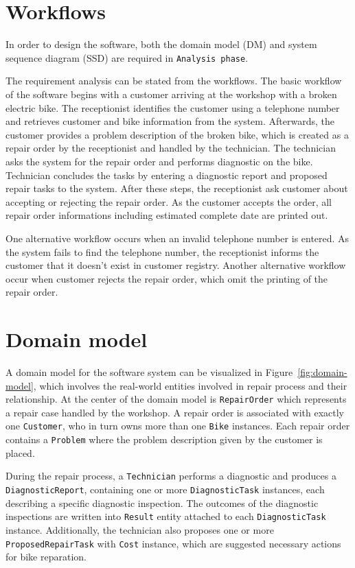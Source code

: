 \documentclass[a4paper]{scrartcl}
\begin{document}
\clearpage
\appendix
\section{Workflows}
\label{appendix:background}

In order to design the software, both the domain model (DM) and system sequence diagram (SSD) are required in \texttt{Analysis phase}.

The requirement analysis can be stated from the workflows. The basic workflow of the software begins with a customer arriving at the workshop with a broken electric bike. The receptionist identifies the customer using a telephone number and retrieves customer and bike information from the system. Afterwards, the customer provides a problem description of the broken bike, which is created as a repair order by the receptionist and handled by the technician. The technician asks the system for the repair order and performs diagnostic on the bike. Technician concludes the tasks by entering a diagnostic report and proposed repair tasks to the system. After these steps, the receptionist ask customer about accepting or rejecting the repair order. As the customer accepts the order, all repair order informations including estimated complete date are printed out.

One alternative workflow occurs when an invalid telephone number is entered. As the system fails to find the telephone number, the receptionist informs the customer that it doesn't exist in customer registry. Another alternative workflow occur when customer rejects the repair order, which omit the printing of the repair order.

\section{Domain model}
\label{appendix:domain-model}
A domain model for the software system can be visualized in Figure~\ref{fig:domain-model}, which involves the real-world entities involved in repair process and their relationship. At the center of the domain model is \texttt{RepairOrder} which represents a repair case handled by the workshop. A repair order is associated with exactly one \texttt{Customer}, who in turn owns more than one \texttt{Bike} instances. Each repair order contains a \texttt{Problem} where the problem description given by the customer is placed.

During the repair process, a \texttt{Technician} performs a diagnostic and produces a \texttt{DiagnosticReport}, containing one or more \texttt{DiagnosticTask} instances, each describing a specific diagnostic inspection. The outcomes of the diagnostic inspections are written into \texttt{Result} entity attached to each \texttt{DiagnosticTask} instance. Additionally, the technician also proposes one or more \texttt{ProposedRepairTask} with \texttt{Cost} instance, which are suggested necessary actions for bike reparation.
\end{document}
